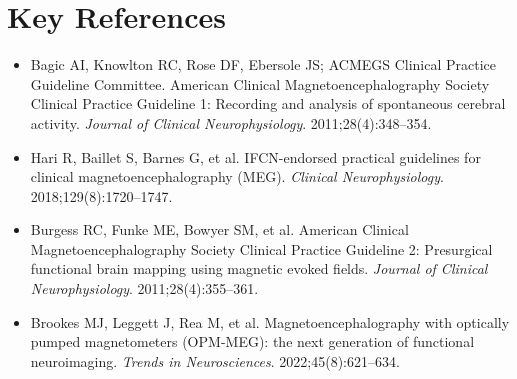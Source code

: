 \section{Key References}
\begin{itemize}
  \item Bagic AI, Knowlton RC, Rose DF, Ebersole JS; ACMEGS Clinical Practice Guideline Committee. American Clinical Magnetoencephalography Society Clinical Practice Guideline 1: Recording and analysis of spontaneous cerebral activity. \emph{Journal of Clinical Neurophysiology}. 2011;28(4):348--354.
  \item Hari R, Baillet S, Barnes G, et al. IFCN-endorsed practical guidelines for clinical magnetoencephalography (MEG). \emph{Clinical Neurophysiology}. 2018;129(8):1720--1747.
  \item Burgess RC, Funke ME, Bowyer SM, et al. American Clinical Magnetoencephalography Society Clinical Practice Guideline 2: Presurgical functional brain mapping using magnetic evoked fields. \emph{Journal of Clinical Neurophysiology}. 2011;28(4):355--361.
  \item Brookes MJ, Leggett J, Rea M, et al. Magnetoencephalography with optically pumped magnetometers (OPM-MEG): the next generation of functional neuroimaging. \emph{Trends in Neurosciences}. 2022;45(8):621--634.
\end{itemize}
